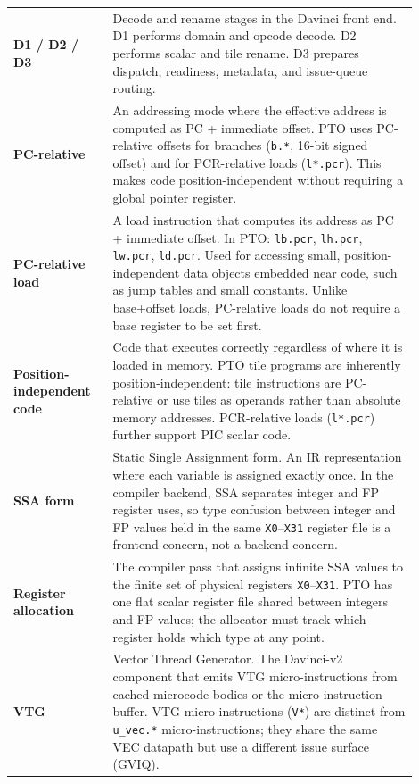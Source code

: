 \begin{longtable}{@{}L{0.22\linewidth}L{0.68\linewidth}@{}}
\textbf{D1 / D2 / D3} & Decode and rename stages in the Davinci front end. D1 performs domain and opcode decode. D2 performs scalar and tile rename. D3 prepares dispatch, readiness, metadata, and issue-queue routing. \\
\textbf{PC-relative} & An addressing mode where the effective address is computed as PC + immediate offset. PTO uses PC-relative offsets for branches (\texttt{b.*}, 16-bit signed offset) and for PCR-relative loads (\texttt{l*.pcr}). This makes code position-independent without requiring a global pointer register. \\
\textbf{PC-relative load} & A load instruction that computes its address as PC + immediate offset. In PTO: \texttt{lb.pcr}, \texttt{lh.pcr}, \texttt{lw.pcr}, \texttt{ld.pcr}. Used for accessing small, position-independent data objects embedded near code, such as jump tables and small constants. Unlike base+offset loads, PC-relative loads do not require a base register to be set first. \\
\textbf{Position-independent code} & Code that executes correctly regardless of where it is loaded in memory. PTO tile programs are inherently position-independent: tile instructions are PC-relative or use tiles as operands rather than absolute memory addresses. PCR-relative loads (\texttt{l*.pcr}) further support PIC scalar code. \\
\textbf{SSA form} & Static Single Assignment form. An IR representation where each variable is assigned exactly once. In the compiler backend, SSA separates integer and FP register uses, so type confusion between integer and FP values held in the same \texttt{X0}--\texttt{X31} register file is a frontend concern, not a backend concern. \\
\textbf{Register allocation} & The compiler pass that assigns infinite SSA values to the finite set of physical registers \texttt{X0}--\texttt{X31}. PTO has one flat scalar register file shared between integers and FP values; the allocator must track which register holds which type at any point. \\
\textbf{VTG} & Vector Thread Generator. The Davinci-v2 component that emits VTG micro-instructions from cached microcode bodies or the micro-instruction buffer. VTG micro-instructions (\texttt{V*}) are distinct from \texttt{u\_vec.*} micro-instructions; they share the same VEC datapath but use a different issue surface (GVIQ). \\
\end{longtable}
